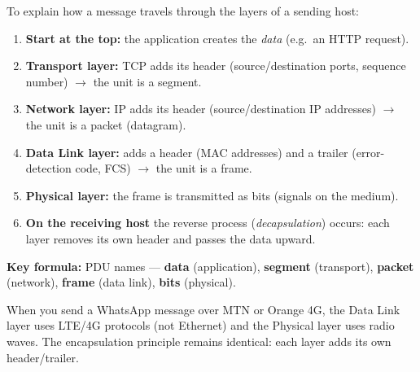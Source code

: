 \documentclass[11pt]{article}
\newcommand{\cle}[1]{{\popxbold\color{popdark}#1}}
\begin{document}
\begin{methode}
To explain how a message travels through the layers of a sending host:
\begin{enumerate}
\item \textbf{Start at the top:} the application creates the \emph{data} (e.g.\ an HTTP request).
\item \textbf{Transport layer:} TCP adds its header (source/destination ports, sequence number) $\rightarrow$ the unit is a \cle{segment}.
\item \textbf{Network layer:} IP adds its header (source/destination IP addresses) $\rightarrow$ the unit is a \cle{packet} (datagram).
\item \textbf{Data Link layer:} adds a header (MAC addresses) and a trailer (error-detection code, FCS) $\rightarrow$ the unit is a \cle{frame}.
\item \textbf{Physical layer:} the frame is transmitted as \cle{bits} (signals on the medium).
\item \textbf{On the receiving host} the reverse process (\emph{decapsulation}) occurs: each layer removes its own header and passes the data upward.
\end{enumerate}
\textbf{Key formula:} PDU names — \textbf{data} (application), \textbf{segment} (transport), \textbf{packet} (network), \textbf{frame} (data link), \textbf{bits} (physical).
\end{methode}

\begin{savaistu}
When you send a WhatsApp message over MTN or Orange 4G, the Data Link layer uses LTE/4G protocols (not Ethernet) and the Physical layer uses radio waves. The encapsulation principle remains identical: each layer adds its own header/trailer.
\end{savaistu}
\end{document}

